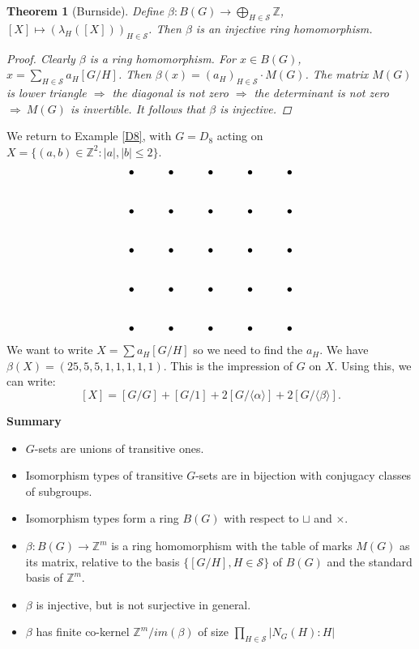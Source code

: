 \documentclass[12pt]{amsart}
\newtheorem{theorem}{Theorem}[section]
\theoremstyle{definition}
\newcommand{\Size}[1]{\left| #1 \right|}
\begin{document}
\begin{theorem}[Burnside]
Define $\beta:B(G)\rightarrow\bigoplus_{H\in\mathcal{S}}\mathbb{Z}$, $[X]\mapsto(\lambda_H([X]))_{H\in\mathcal{S}}$.  Then $\beta$ is an injective ring homomorphism.

\begin{proof}
Clearly $\beta$ is a ring homomorphism.  For $x\in B(G)$, $x=\sum_{H\in\mathcal{S}}a_H[G/H]$.  Then $\beta(x)=(a_H)_{H\in\mathcal{S}}\cdot M(G)$.  The matrix $M(G)$ is lower triangle $\Rightarrow$ the diagonal is not zero $\Rightarrow$ the determinant is not zero $\Rightarrow\ M(G)$ is invertible.  It follows that $\beta$ is injective.
\end{proof}
\end{theorem}

We return to Example \ref{D8}, with $G=D_8$ acting on $X=\{(a,b)\in\mathbb{Z}^2:\Size{a},\Size{b}\leq2\}$.
$$\xymatrix{{\bullet} & {\bullet} & {\bullet} & {\bullet} & {\bullet} \\
{\bullet} & {\bullet} & {\bullet} & {\bullet} & {\bullet} \\
{\bullet} & {\bullet} & {\bullet} & {\bullet} & {\bullet} \\
{\bullet} & {\bullet} & {\bullet} & {\bullet} & {\bullet} \\
{\bullet} & {\bullet} & {\bullet} & {\bullet} & {\bullet}}$$
We want to write $X=\sum a_H[G/H]$ so we need to find the $a_H$.  We have $\beta(X)=(25,5,5,1,1,1,1,1)$.  This is the impression of $G$ on $X$.  Using this, we can write:
$$[X]=[G/G]+[G/1]+2[G/\langle\alpha\rangle]+2[G/\langle\beta\rangle].$$

\begin{center}
\textbf{Summary}
\end{center}
\begin{itemize}
\item $G$-sets are unions of transitive ones.
\item Isomorphism types of transitive $G$-sets are in bijection with conjugacy classes of subgroups.
\item Isomorphism types form a ring $B(G)$ with respect to $\sqcup$ and $\times$.
\item $\beta:B(G)\rightarrow\mathbb{Z}^m$ is a ring homomorphism with the table of marks $M(G)$ as its matrix, relative to the basis $\{[G/H], H\in\mathcal{S}\}$ of $B(G)$ and the standard basis of $\mathbb{Z}^m$.
\item $\beta$ is injective, but is not surjective in general.
\item $\beta$ has finite co-kernel $\mathbb{Z}^m/im(\beta)$ of size $\prod_{H\in\mathcal{S}}\Size{N_G(H):H}$
\end{itemize}
\end{document}

